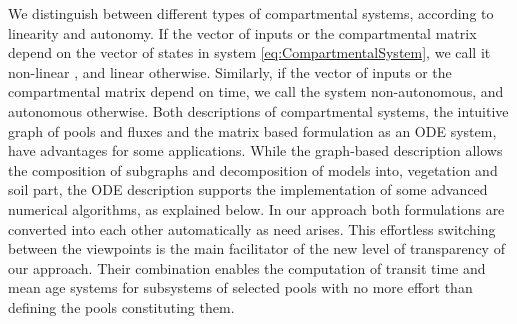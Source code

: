 We distinguish between different types of compartmental systems, according to linearity and autonomy. If the vector of inputs or the compartmental matrix depend on the vector of states in system \eqref{eq:CompartmentalSystem}, we call it non-linear , and linear otherwise. Similarly, if the vector of inputs or the compartmental matrix depend on time, we call the system non-autonomous, and autonomous otherwise. 
Both descriptions of compartmental systems, the intuitive graph of pools and fluxes and the 
matrix based formulation as an ODE system, have advantages for some applications. 
While the graph-based description allows the composition of subgraphs and decomposition of models into, \eg vegetation and soil part, the ODE description supports the implementation of some advanced numerical algorithms, as explained below.
In our approach both formulations are converted into each other automatically as need arises.
This effortless switching between the viewpoints is the main facilitator of the new level of transparency of our approach. Their combination enables the computation of transit time and mean age systems for subsystems of selected pools with no more effort than defining the pools constituting them.

